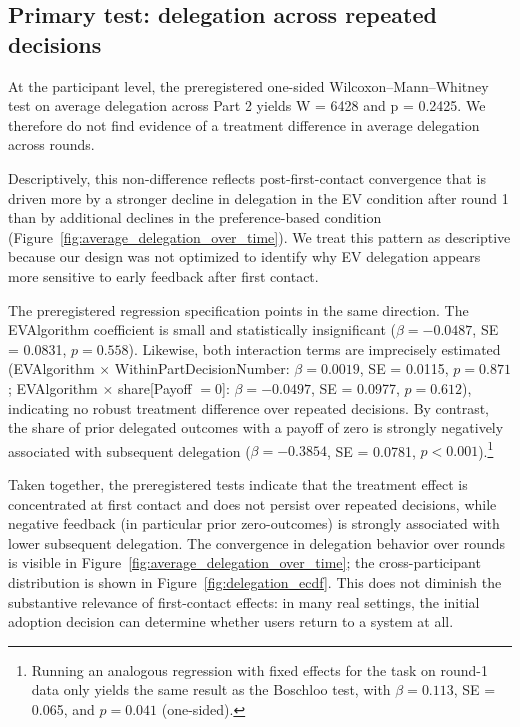 \documentclass[a4paper, 12pt, fleqn]{article}
\theoremstyle{definition}
\begin{document}
\subsection{Primary test: delegation across repeated decisions}
At the participant level, the preregistered one-sided Wilcoxon--Mann--Whitney test on average delegation across Part 2 yields W = 6428 and p = 0.2425. We therefore do not find evidence of a treatment difference in average delegation across rounds.

Descriptively, this non-difference reflects post-first-contact convergence that is driven more by a stronger decline in delegation in the EV condition after round 1 than by additional declines in the preference-based condition (Figure~\ref{fig:average_delegation_over_time}). We treat this pattern as descriptive because our design was not optimized to identify why EV delegation appears more sensitive to early feedback after first contact.

The preregistered regression specification points in the same direction. The EVAlgorithm coefficient is small and statistically insignificant ($\beta = -0.0487$, SE = 0.0831, $p = 0.558$). Likewise, both interaction terms are imprecisely estimated (EVAlgorithm $\times$ WithinPartDecisionNumber: $\beta = 0.0019$, SE = 0.0115, $p = 0.871$; EVAlgorithm $\times$ share[Payoff $= 0$]: $\beta = -0.0497$, SE = 0.0977, $p = 0.612$), indicating no robust treatment difference over repeated decisions. By contrast, the share of prior delegated outcomes with a payoff of zero is strongly negatively associated with subsequent delegation ($\beta = -0.3854$, SE = 0.0781, $p < 0.001$).\footnote{Running an analogous regression with fixed effects for the task on round-1 data only yields the same result as the Boschloo test, with $\beta = 0.113$, SE = 0.065, and $p = 0.041$ (one-sided).}

Taken together, the preregistered tests indicate that the treatment effect is concentrated at first contact and does not persist over repeated decisions, while negative feedback (in particular prior zero-outcomes) is strongly associated with lower subsequent delegation. The convergence in delegation behavior over rounds is visible in Figure~\ref{fig:average_delegation_over_time}; the cross-participant distribution is shown in Figure~\ref{fig:delegation_ecdf}. This does not diminish the substantive relevance of first-contact effects: in many real settings, the initial adoption decision can determine whether users return to a system at all.
\end{document}
